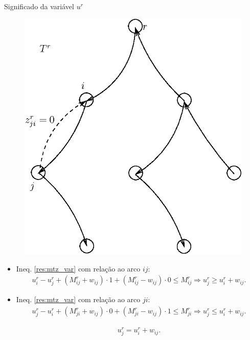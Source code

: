 \documentclass[dvipsnames]{beamer}
\begin{document}
\begin{frame}{Significado da variável $u^{r}$ \hyperlink{var_u}{\beamergotobutton{$\leftarrow$}}}
  \hypertarget{sig_u}{}
  \begin{figure}[H]
\centering
%
\includegraphics[scale=0.45]{figures/variavel_u.eps}
\label{fig:fig1}
  \end{figure}

  {\footnotesize
  \begin{itemize}

  \item Ineq. \ref{res:mtz_var} com relação ao arco $ij:$
    \begin{align*}
  u^{r}_i - u^{r}_j + (M^{r}_{ij} + w_{ij}) \cdot 1 + (M^{r}_{ij} - w_{ij}) \cdot 0 \le M^{r}_{ij} \Rightarrow u^{r}_j \ge u^{r}_i + w_{ij}.
\end{align*}
    
  \item Ineq. \ref{res:mtz_var} com relação ao arco $ji:$
    \begin{align*}
  u^{r}_j - u^{r}_i + (M^{r}_{ji} + w_{ij}) \cdot 0 + (M^{r}_{ji} - w_{ij}) \cdot 1 \le M^{r}_{ji} \Rightarrow u^{r}_j \le u^{r}_i + w_{ij}.
\end{align*}

\begin{align*}
  u^{r}_j = u^{r}_i + w_{ij}.
\end{align*}

    
  \end{itemize}
}
  
\end{frame}
\end{document}
